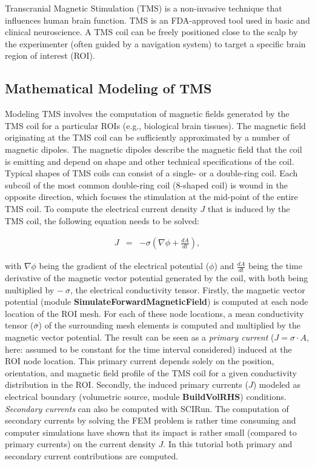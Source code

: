 \documentclass[fleqn,11pt,openany]{book}
\begin{document}
Transcranial Magnetic Stimulation (TMS) is a non-invasive technique that influences human brain function. TMS is an FDA-approved tool used in basic and clinical neuroscience.
A TMS coil can be freely positioned close to the scalp by the experimenter (often guided by a navigation system) to target a specific brain region of interest (ROI).

\subsection{Mathematical Modeling  of TMS}

Modeling TMS involves the computation of magnetic fields generated by the TMS coil for a particular ROIs (e.g., biological brain tissues).
The magnetic field originating at the TMS coil can be sufficiently approximated by a number of magnetic dipoles. The magnetic dipoles describe the magnetic field
that the coil is emitting and depend on shape and other technical specifications of the coil. Typical shapes of TMS coils can consist of a single- or a double-ring
coil. Each subcoil of the most common double-ring coil (8-shaped coil) is wound in the opposite direction, which focuses the stimulation at the mid-point of the entire
TMS coil. To compute the electrical current density $J$ that is induced by the TMS coil, the following equation needs to be solved:

\begin{center}
	\begin{eqnarray*}
		J &=& -\sigma (\nabla{\phi} + \frac{dA}{dt}),
	\end{eqnarray*}
\end{center}

with $\nabla{\phi}$ being the gradient of the electrical potential ($\phi$) and $\frac{dA}{dt}$ being the time derivative of the magnetic vector
potential generated by the coil, with both being multiplied
by $-\ \sigma$, the electrical conductivity tensor. Firstly, the magnetic vector potential (module \textbf{SimulateForwardMagneticField}) is computed at each node location of the ROI mesh. For each of these node locations, a mean conductivity tensor ($\bar{\sigma}$) of the surrounding
mesh elements is computed and multiplied by the magnetic vector potential.
The result can be seen as a \textit{primary current} ($J = \sigma \cdot A$, here: assumed to be constant for the time interval considered) induced at the ROI node location.
This primary current depends solely on the position, orientation, and magnetic field profile of the TMS coil for a given conductivity distribution in the ROI.
Secondly, the induced primary currents ($J$) modeled as electrical boundary (volumetric source, module \textbf{BuildVolRHS}) conditions. \textit{Secondary currents} can also be computed with SCIRun. The
computation of secondary currents by solving the FEM problem is rather time consuming and computer simulations have shown that its impact is rather small (compared to primary currents) on the current density $J$. 
In this tutorial both primary and secondary current contributions are computed.
\end{document}
